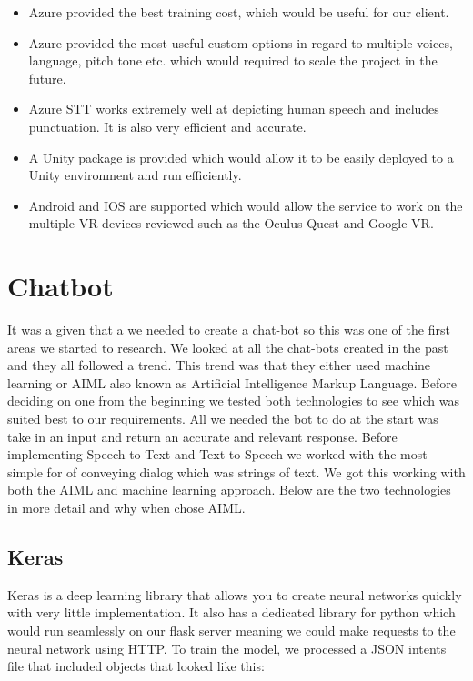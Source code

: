 \begin{itemize}
  \item Azure provided the best training cost, which would be useful for our client.
  \item Azure provided the most useful custom options in regard to multiple voices, language, pitch tone etc. which would required to scale the project in the future.
  \item Azure STT works extremely well at depicting human speech and includes punctuation. It is also very efficient and accurate.
  \item A Unity package is provided which would allow it to be easily deployed to a Unity environment and run efficiently.
  \item Android and IOS are supported which would allow the service to work on the multiple VR devices reviewed such as the Oculus Quest and Google VR.
\end{itemize}

\section{Chatbot}
It was a given that a we needed to create a chat-bot so this was one of the first areas we started to research. We looked at all the chat-bots created in the past and they all followed a trend. This trend was that they either used machine learning or AIML also known as Artificial Intelligence Markup Language. Before deciding on one from the beginning we tested both technologies to see which was suited best to our requirements. All we needed the bot to do at the start was take in an input and return an accurate and relevant response. Before implementing Speech-to-Text and Text-to-Speech we worked with the most simple for of conveying dialog which was strings of text. We got this working with both the AIML and machine learning
approach. Below are the two technologies in more detail and why when chose AIML.

\subsection{Keras}
Keras is a deep learning library that allows you to create neural networks quickly with very little implementation. It also has a dedicated library for python which would run seamlessly on our flask server meaning we could make requests to the neural network using HTTP. To train the model, we processed a JSON intents file that included objects that looked like this:

